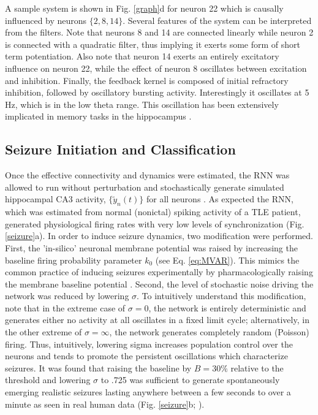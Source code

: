\documentclass[11pt,a4paper,final]{article}
\begin{document}
A sample system is shown in Fig. \ref{graph}d for neuron 22 which is causally influenced by neurons $\{2,8,14\}$.
Several features of the system can be interpreted from the filters.
Note that neurons 8 and 14 are connected linearly while neuron 2 is connected with a quadratic filter, thus implying it exerts some form of short term potentiation.
Also note that neuron 14 exerts an entirely excitatory influence on neuron 22, while the effect of neuron 8 oscillates between excitation and inhibition.
Finally, the feedback kernel is composed of initial refractory inhibition, followed by oscillatory bursting activity.
Interestingly it oscillates at 5 Hz, which is in the low theta range.
This oscillation has been extensively implicated in memory tasks in the hippocampus \citep{buzsaki06,sandler14}.

    \subsection{Seizure Initiation and Classification}

Once the effective connectivity and dynamics were estimated, the RNN was allowed to run without perturbation and stochastically generate simulated hippocampal CA3 activity, $\{\tilde{y}_n(t)\}$ for all \nn{} neurons \citep{pillow08}.
As expected the RNN, which was estimated from normal (nonictal) spiking activity of a TLE patient, generated physiological firing rates with very low levels of synchronization (Fig. \ref{seizure}a).
In order to induce seizure dynamics, two modification were performed.
First, the 'in-silico' neuronal membrane potential was raised by increasing the baseline firing probability parameter $k_0$ (see Eq. \ref{eq:MVAR}).
This mimics the common practice of inducing seizures experimentally by pharmacologically raising the membrane baseline potential \citep{fricker99,avoli02}.
Second, the level of stochastic noise driving the network was reduced by lowering $\sigma$.
To intuitively understand this modification, note that in the extreme case of $\sigma=0$, the network is entirely deterministic and generates either no activity at all oscillates in a fixed limit cycle;
alternatively, in the other extreme of $\sigma=\infty$, the network generates completely random (Poisson) firing.
Thus, intuitively, lowering sigma increases population control over the neurons and tends to promote the persistent oscillations which characterize seizures.
It was found that raising the baseline by $B=30\%$ relative to the threshold and lowering $\sigma$ to .725 was sufficient to generate spontaneously emerging realistic seizures lasting anywhere between a few seconds to over a minute as seen in real human data (Fig. \ref{seizure}b; \citet{bower12,truccolo14}).	
\end{document}
